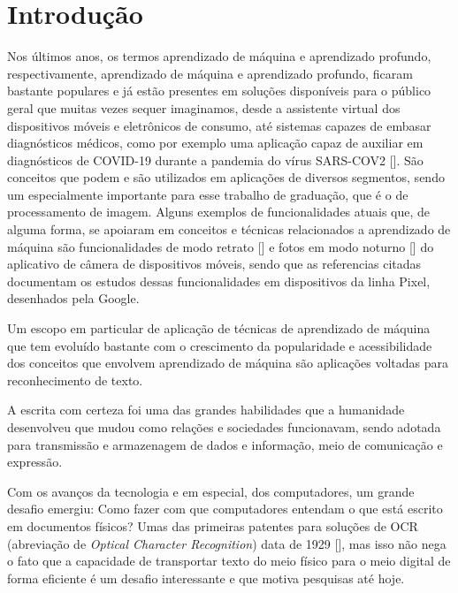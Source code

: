 
\chapter[Introdução]{Introdução}

Nos últimos anos, os termos aprendizado de máquina e aprendizado profundo, respectivamente, aprendizado de máquina e aprendizado profundo, ficaram bastante populares e já estão presentes em soluções disponíveis para o público geral que muitas vezes sequer imaginamos, desde a assistente virtual dos dispositivos móveis e eletrônicos de consumo, até sistemas capazes de embasar diagnósticos médicos, como por exemplo uma aplicação capaz de auxiliar em diagnósticos de COVID-19 durante a pandemia do vírus SARS-COV2 []. São conceitos que podem e são utilizados em aplicações de diversos segmentos, sendo um especialmente importante para esse trabalho de graduação, que é o de processamento de imagem. Alguns exemplos de funcionalidades atuais que, de alguma forma, se apoiaram em conceitos e técnicas relacionados a aprendizado de máquina são funcionalidades de modo retrato [] e fotos em modo noturno [] do aplicativo de câmera de dispositivos móveis, sendo que as referencias citadas documentam os estudos dessas funcionalidades em dispositivos da linha Pixel, desenhados pela Google.

Um escopo em particular de aplicação de técnicas de aprendizado de máquina que tem evoluído bastante com o crescimento da popularidade e acessibilidade dos conceitos que envolvem aprendizado de máquina são aplicações voltadas para reconhecimento de texto. 

A escrita com certeza foi uma das grandes habilidades que a humanidade desenvolveu que mudou como relações e sociedades funcionavam, sendo adotada para transmissão e armazenagem de dados e informação, meio de comunicação e expressão.

Com os avanços da tecnologia e em especial, dos computadores, um grande desafio emergiu: Como fazer com que computadores entendam o que está escrito em documentos físicos? Umas das primeiras patentes para soluções de OCR (abreviação de \textit{Optical Character Recognition}) data de 1929 [], mas isso não nega o fato que a capacidade de transportar texto do meio físico para o meio digital de forma eficiente é um desafio interessante e que motiva pesquisas até hoje.

